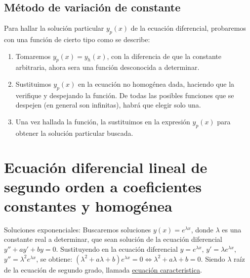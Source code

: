 \documentclass{report}
\begin{document}
\subsection{Método de variación de constante}
Para hallar la solución particular $y_p(x)$ de la ecuación diferencial, probaremos  con una función de cierto tipo como se describe:
\begin{enumerate}
	\item Tomaremos $y_p(x)=y_h(x)$, con la diferencia de que la constante arbitraria, ahora sera una función desconocida a determinar.
	\item Sustituimos $y_p(x)$ en la ecuación no homogénea dada, haciendo que la verifique y despejando la función. De todas las posibles funciones que se despejen (en general son infinitas), habrá que elegir solo una.
	\item Una vez hallada la función, la sustituimos en la expresión $y_p(x)$ para obtener la solución particular buscada.
\end{enumerate}
\newpage \section{Ecuación diferencial lineal de segundo orden a coeficientes constantes y homogénea}
Soluciones exponenciales: Buscaremos soluciones $y(x)=e^{\lambda x}$, donde $\lambda$ es una constante real a determinar, que sean solución de la ecuación diferencial $y''+ay'+by=0$. Sustituyendo en la ecuación diferencial $y=e^{\lambda x}$, $y'=\lambda e^{\lambda x}$, $y''=\lambda ^{2}e^{\lambda x}$, se obtiene: $(\lambda ^2+a\lambda+b)e^{\lambda x}=0\Leftrightarrow \lambda ^2+a\lambda+b=0$. Siendo $\lambda$ raíz de la ecuación de segundo grado, llamada \underline{ecuación caracteristica}.
\end{document}
